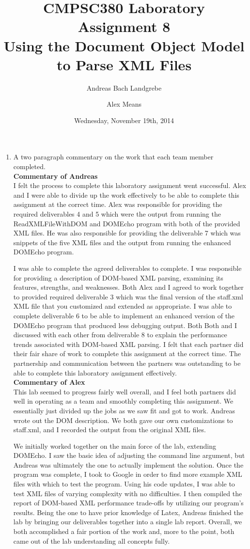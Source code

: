 \documentclass[11pt,english]{article}
\date{Wednesday, November 19th, 2014}
\title{CMPSC380 Laboratory Assignment 8 \\
Using the Document Object Model to Parse XML Files}
\author[1]{Andreas Bach Landgrebe}
\author[1]{Alex Means}
\affil[1]{Allegheny College, Department of Computer Science}
\begin{document}
\maketitle
\newpage
\begin{enumerate}
\item A two paragraph commentary on the work that each team member completed.
\\
\textbf{Commentary of Andreas}
\\
I felt the process to complete this laboratory assignment went successful. Alex and I were able to divide up the work effectively to be able to complete this assignment at the correct time. Alex was responsible for providing the required deliverables 4 and 5 which were the output from running the ReadXMLFileWithDOM and DOMEcho program with both of the provided XML files. He was also responsible for providing the deliverable 7 which was snippets of the five XML files and the output from running the enhanced DOMEcho program.
\par
I was able to complete the agreed deliverables to complete. I was responsible for providing a description of DOM-based XML parsing, examining its features, strengths, and weaknesses. Both Alex and I agreed to work together to provided required deliverable 3 which was the final version of the staff.xml XML file that you customized and extended as appropriate. I was able to complete deliverable 6 to be able to implement an enhanced version of the DOMEcho program that produced less debugging output. Both Both and I discussed with each other from deliverable 8 to explain the performance trends associated with DOM-based XML parsing. I felt that each partner did their fair share of work to complete this assignment at the correct time. The partnership and communication between the partners was outstanding to be able to complete this laboratory assignment effectively.
\\
\newpage
\textbf{Commentary of Alex}
\\
This lab seemed to progress fairly well overall, and I feel both partners did well in operating as a team and smoothly completing this assignment. We essentially just divided up the jobs as we saw fit and got to work. Andreas wrote out the DOM description. We both gave our own customizations to staff.xml, and I recorded the output from the original XML files.
\par
We initially worked together on the main force of the lab, extending DOMEcho. I saw the basic idea of adjusting the command line argument, but Andreas was ultimately the one to actually implement the solution. Once the program was complete, I took to Google in order to find more example XML files with which to test the program. Using his code updates, I was able to test XML files of varying complexity with no difficulties. I then compiled the report of DOM-based XML performance trade-offs by utilizing our program's results. Being the one to have prior knowledge of Latex, Andreas finished the lab by bringing our deliverables together into a single lab report. Overall, we both accomplished a fair portion of the work and, more to the point, both came out of the lab understanding all concepts fully.


\end{enumerate}
\end{document}
